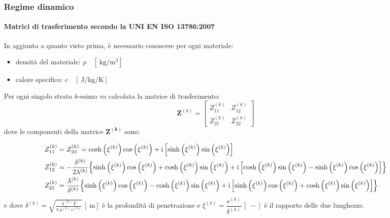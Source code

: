 \documentclass[aspectratio=141,10pt]{beamer}
\begin{document}
\begin{frame}
    \frametitle{Regime dinamico}
    \framesubtitle{Matrici di trasferimento secondo la UNI EN ISO 13786:2007}
In aggiunta a quanto visto prima, è necessario conoscere per ogni materiale:
    \begin{itemize}
        \item densità del materiale: $\rho \quad \left[\SI{}{\kilo\gram\per\metre\cubed}\right]$
        \item calore specifico: $c \quad \left[\SI{}{\joule\per\kilo\gram\per\kelvin}\right]$
    \end{itemize}

    Per ogni singolo strato $k$-esimo va calcolata la matrice di trasferimento:
\begin{equation*}
    \mathbf{Z}^{(k)} =
    \begin{bmatrix}  
        Z_{11}^{(k)} & Z_{12}^{(k)} \\
        Z_{21}^{(k)} & Z_{22}^{(k)}
    \end{bmatrix}
\end{equation*}
\pause
dove le componenti della matrice $\mathbf{Z^{(k)}}$ sono:

{\scriptsize
\begin{align*}
    Z_{11}^{(k)} &= Z_{22}^{(k)} = \cosh\left(\xi^{(k)}\right)\cos\left(\xi^{(k)}\right) + \mathrm{i} \left[\sinh\left(\xi^{(k)}\right)\sin\left(\xi^{(k)}\right)\right] \\
    Z_{12}^{(k)} &=-\frac{\delta^{(k)}}{2\lambda^{(k)}}\Bigl\{\sinh\left(\xi^{(k)}\right)\cos\left(\xi^{(k)}\right)+\cosh\left(\xi^{(k)}\right)\sin\left(\xi^{(k)}\right) + \mathrm{i}\left[\cosh\left(\xi^{(k)}\right)\sin\left(\xi^{(k)}\right)-\sinh\left(\xi^{(k)}\right)\cos\left(\xi^{(k)}\right)\right]  \Bigr\} \\
    Z_{21}^{(k)} &= \frac{\lambda^{(k)}}{\delta^{(k)}}\Bigl\{  \sinh\left(\xi^{(k)}\right)\cos\left(\xi^{(k)}\right)-\cosh\left(\xi^{(k)}\right)\sin\left(\xi^{(k)}\right) + \mathrm{i} \left[\sinh\left(\xi^{(k)}\right)\cos\left(\xi^{(k)}\right)+\cosh\left(\xi^{(k)}\right)\sin\left(\xi^{(k)}\right)\right] \Bigr\}
\end{align*}}
e dove $\delta^{(k)} = \sqrt{\frac{\lambda^{(k)} \, T}{\pi \,\rho^{(k)} \,c^{(k)}}} \,\left[\SI{}{\metre}\right]$ è la profondità di penetrazione e $\xi^{(k)} = \dfrac{s^{(k)}}{\delta^{(k)}} \,\left[\SI{}{-}\right]$ è il rapporto delle due lunghezze.

\end{frame}
\end{document}
